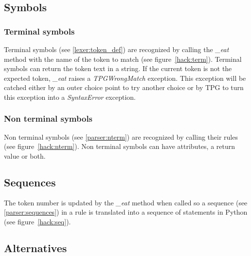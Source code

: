 
\clearpage
\subsection{Symbols}

\subsubsection{Terminal symbols}

Terminal symbols (see \ref{lexer:token_def}) are recognized by calling the \emph{\_eat} method with the name of the token to match (see figure~\ref{hack:term}).
Terminal symbols can return the token text in a string.
If the current token is not the expected token, \emph{\_eat} raises a \emph{TPGWrongMatch} exception.
This exception will be catched either by an outer choice point to try another choice or by TPG to turn this exception into a \emph{SyntaxError} exception.


\subsubsection{Non terminal symbols}

Non terminal symbols (see \ref{parser:nterm}) are recognized by calling their rules (see figure~\ref{hack:nterm}).
Non terminal symbols can have attributes, a return value or both.


\clearpage
\subsection{Sequences}										\label{hack:sequences}

The token number is updated by the \emph{\_eat} method when called so a sequence (see \ref{parser:sequences}) in a rule is translated into a sequence of statements in Python (see figure~\ref{hack:seq}).


\clearpage
\subsection{Alternatives}									\label{hack:alternatives}

